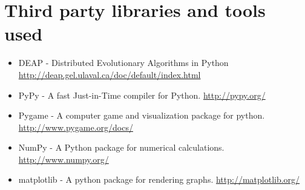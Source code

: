 \documentclass[a4paper,11pt]{kth-mag}
\begin{document}
\chapter{Third party libraries and tools used}
\label{list-of-third-party-tools}
\begin{itemize}
\item DEAP - Distributed Evolutionary Algorithms in Python \url{http://deap.gel.ulaval.ca/doc/default/index.html}
\item PyPy - A fast Just-in-Time compiler for Python. \url{http://pypy.org/}
\item Pygame - A computer game and visualization package for python. \url{http://www.pygame.org/docs/}
\item NumPy - A Python package for numerical calculations. \url{http://www.numpy.org/}
\item matplotlib - A python package for rendering graphs. \url{http://matplotlib.org/}
\end{itemize}
\end{document}
